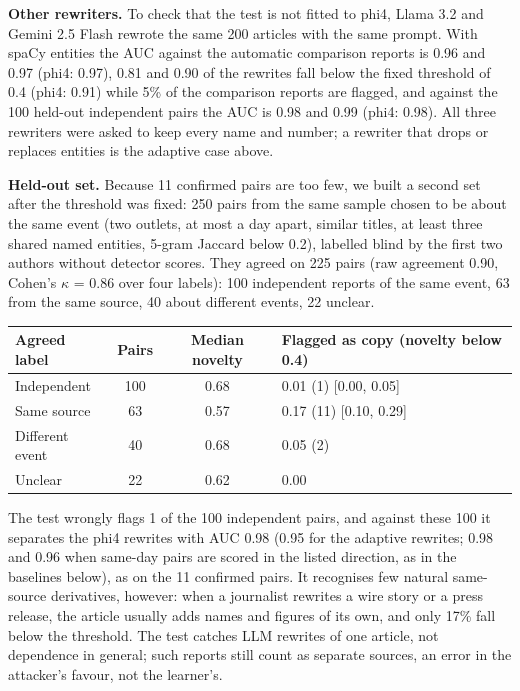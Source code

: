 \textbf{Other rewriters.} To check that the test is not fitted to phi4, Llama 3.2 and Gemini 2.5 Flash rewrote the same 200 articles with the same prompt. With spaCy entities the AUC against the automatic comparison reports is 0.96 and 0.97 (phi4: 0.97), 0.81 and 0.90 of the rewrites fall below the fixed threshold of 0.4 (phi4: 0.91) while 5\% of the comparison reports are flagged, and against the 100 held-out independent pairs the AUC is 0.98 and 0.99 (phi4: 0.98). All three rewriters were asked to keep every name and number; a rewriter that drops or replaces entities is the adaptive case above.

\textbf{Held-out set.} Because 11 confirmed pairs are too few, we built a second set after the threshold was fixed: 250 pairs from the same sample chosen to be about the same event (two outlets, at most a day apart, similar titles, at least three shared named entities, 5-gram Jaccard below 0.2), labelled blind by the first two authors without detector scores. They agreed on 225 pairs (raw agreement 0.90, Cohen's $\kappa$ = 0.86 over four labels): 100 independent reports of the same event, 63 from the same source, 40 about different events, 22 unclear.

\begin{table}[htbp]\centering\small
\begin{tabularx}{\linewidth}{lccZ}
\toprule
Agreed label & Pairs & Median novelty & Flagged as copy (novelty below 0.4) \\
\midrule
Independent & 100 & 0.68 & 0.01 (1) [0.00, 0.05] \\
Same source & 63 & 0.57 & 0.17 (11) [0.10, 0.29] \\
Different event & 40 & 0.68 & 0.05 (2) \\
Unclear & 22 & 0.62 & 0.00 \\
\bottomrule
\end{tabularx}
\end{table}

The test wrongly flags 1 of the 100 independent pairs, and against these 100 it separates the phi4 rewrites with AUC 0.98 (0.95 for the adaptive rewrites; 0.98 and 0.96 when same-day pairs are scored in the listed direction, as in the baselines below), as on the 11 confirmed pairs. It recognises few natural same-source derivatives, however: when a journalist rewrites a wire story or a press release, the article usually adds names and figures of its own, and only 17\% fall below the threshold. The test catches LLM rewrites of one article, not dependence in general; such reports still count as separate sources, an error in the attacker's favour, not the learner's.

